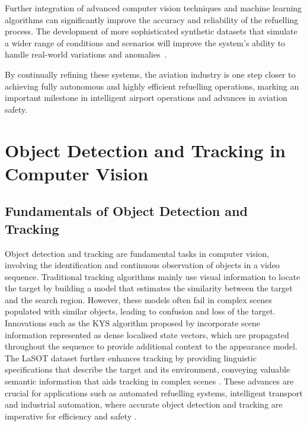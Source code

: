 \documentclass[12pt,oneside]{book} %
\begin{document}
Further integration of advanced computer vision techniques and machine learning
algorithms can significantly improve the accuracy and reliability of the
refuelling process. The development of more sophisticated synthetic datasets
that simulate a wider range of conditions and scenarios will improve the
system's ability to handle real-world variations and
anomalies~\cite{HybridDatasetAGRV2}.

By continually refining these systems, the aviation industry is one step closer
to achieving fully autonomous and highly efficient refuelling operations,
marking an important milestone in intelligent airport operations and advances
in aviation safety.

\section{Object Detection and Tracking in Computer Vision}

\subsection{Fundamentals of Object Detection and Tracking}
Object detection and tracking are fundamental tasks in computer vision,
involving the identification and continuous observation of objects in a video
sequence. Traditional tracking algorithms mainly use visual information to
locate the target by building a model that estimates the similarity between the
target and the search region. However, these models often fail in complex
scenes populated with similar objects, leading to confusion and loss of the
target. Innovations such as the KYS algorithm proposed by \citet{Bhat2020}
incorporate scene information represented as dense localised state vectors,
which are propagated throughout the sequence to provide additional context to
the appearance model. The LaSOT dataset further enhances tracking by providing
linguistic specifications that describe the target and its environment,
conveying valuable semantic information that aids tracking in complex scenes
\cite{SurveyVisualOT}. These advances are crucial for applications such as
automated refuelling systems, intelligent transport and industrial automation,
where accurate object detection and tracking are imperative for efficiency and
safety \cite{OverviewCorrelationAlgoOT, SuveyAdvancesSingleOTMethods}.
\end{document}
